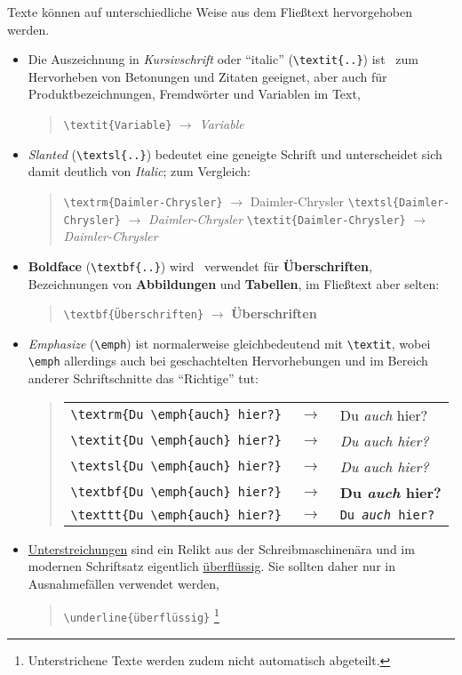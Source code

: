 Texte können auf unterschiedliche Weise aus dem Fließtext hervorgehoben werden.
\begin{itemize}
%
\item Die Auszeichnung in \textit{Kursivschrift} oder "`italic"' (\verb!\textit{..}!) ist \va\ zum Hervorheben von
Betonungen und Zitaten geeignet, aber auch für
Produktbezeichnungen, Fremdwörter und Variablen im Text, \zB
%
\begin{quote}
\verb!\textit{Variable}! $\rightarrow$ \textit{Variable}
\end{quote}
%
\item \textsl{Slanted} %
(\verb!\textsl{..}!) bedeutet eine geneigte Schrift und
unterscheidet sich damit deutlich von \textit{Italic}; 
zum Vergleich:
%
\begin{quote}
\verb!\textrm{Daimler-Chrysler}! $\rightarrow$ \textrm{Daimler-Chrysler} \newline%
\verb!\textsl{Daimler-Chrysler}! $\rightarrow$ \textsl{Daimler-Chrysler} \newline%
\verb!\textit{Daimler-Chrysler}! $\rightarrow$ \textit{Daimler-Chrysler}
\end{quote}
%
\item \textbf{Boldface} (\verb!\textbf{..}!) wird \ia\ verwendet für 
\textbf{Überschriften}, Bezeichnungen von \textbf{Abbildungen} und 
\textbf{Tabellen}, im Fließtext aber selten:
%
\begin{quote}
\verb!\textbf{Überschriften}! $\rightarrow$ \textbf{Überschriften}
\end{quote}
%
\item \emph{Emphasize} (\verb!\emph!) %
ist normalerweise gleichbedeutend mit \verb!\textit!, wobei
\verb!\emph! allerdings auch bei geschachtelten
Hervorhebungen und im Bereich anderer Schriftschnitte das
"`Richtige"' tut: 
%
\begin{quote}
\setlength{\tabcolsep}{0pt}%
\begin{tabular}{lcl}
\verb!\textrm{Du \emph{auch} hier?}! & $\;\rightarrow\;$ &
    \textrm{Du \emph{auch} hier?}
\\
\verb!\textit{Du \emph{auch} hier?}! & $\;\rightarrow\;$ &
    \textit{Du \emph{auch} hier?} 
\\
\verb!\textsl{Du \emph{auch} hier?}! & $\;\rightarrow\;$ & 
    \textsl{Du \emph{auch} hier?}
\\
\verb!\textbf{Du \emph{auch} hier?}! & $\;\rightarrow\;$ & 
    \textbf{Du \emph{auch} hier?}
\\
\verb!\texttt{Du \emph{auch} hier?}! & $\;\rightarrow\;$ & 
    \texttt{Du \emph{auch} hier?}
\end{tabular}
\end{quote}
%
\item \underline{Unterstreichungen} sind ein Relikt aus der 
Schreibmaschinenära und im modernen Schriftsatz
eigentlich \underline{überflüssig}. Sie sollten daher nur in
Ausnahmefällen verwendet werden, \zB
%
\begin{quote}
\verb!\underline{überflüssig}!%
\footnote{Unterstrichene Texte werden zudem nicht automatisch abgeteilt.}
\end{quote}
%
\end{itemize}



